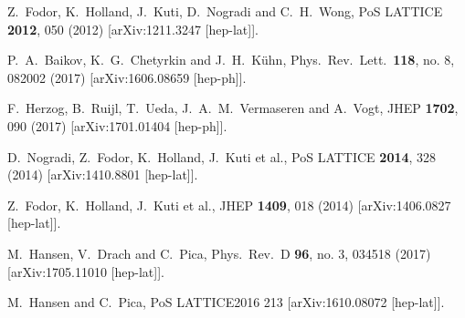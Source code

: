 \documentclass[epj]{webofc}
\begin{document}
\begin{thebibliography}{99}
  Z.~Fodor, K.~Holland, J.~Kuti, D.~Nogradi and C.~H.~Wong,
  PoS LATTICE {\bf 2012}, 050 (2012)
  [arXiv:1211.3247 [hep-lat]].



  P.~A.~Baikov, K.~G.~Chetyrkin and J.~H.~Kühn,
  Phys.\ Rev.\ Lett.\  {\bf 118}, no. 8, 082002 (2017)
  [arXiv:1606.08659 [hep-ph]].



  F.~Herzog, B.~Ruijl, T.~Ueda, J.~A.~M.~Vermaseren and A.~Vogt,
  JHEP {\bf 1702}, 090 (2017)
  [arXiv:1701.01404 [hep-ph]].



  D.~Nogradi, Z.~Fodor, K.~Holland, J.~Kuti et al.,
  PoS LATTICE {\bf 2014}, 328 (2014)
  [arXiv:1410.8801 [hep-lat]].



  Z.~Fodor, K.~Holland, J.~Kuti et al.,
  JHEP {\bf 1409}, 018 (2014)
  [arXiv:1406.0827 [hep-lat]].



  M.~Hansen, V.~Drach and C.~Pica,
  Phys.\ Rev.\ D {\bf 96}, no. 3, 034518 (2017)
  [arXiv:1705.11010 [hep-lat]].



  M.~Hansen and C.~Pica,
  PoS LATTICE2016 213
  [arXiv:1610.08072 [hep-lat]].




\end{thebibliography}
\end{document}
